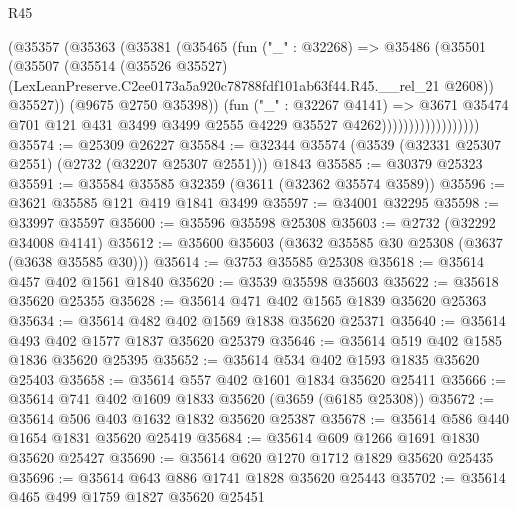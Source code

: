 \begin{lexlean}{R45}
\begin{coremodule}
                              (@35357
                                (@35363
                                  (@35381
                                    (@35465
                                      (fun ("_" : @32268) =>
                                      @35486
                                        (@35501
                                          (@35507
                                            (@35514
                                              (@35526 @35527)
                                              (LexLeanPreserve.C2ee0173a5a920c78788fdf101ab63f44.R45.__rel_21
                                                @2608))
                                            @35527))
                                        (@9675 @2750 @35398))
                                      (fun ("_" : @32267 @4141) =>
                                      @3671
                                        @35474
                                        @701
                                        @121
                                        @431
                                        @3499
                                        @3499
                                        @2555
                                        @4229
                                        @35527
                                        @4262))))))))))))))))))
@35574 := @25309 @26227
@35584 := @32344 @35574 (@3539 (@32331 @25307 @2551) (@2732 (@32207 @25307 @2551))) @1843
@35585 := @30379 @25323
@35591 := @35584 @35585 @32359 (@3611 (@32362 @35574 @3589))
@35596 := @3621 @35585 @121 @419 @1841 @3499
@35597 := @34001 @32295
@35598 := @33997 @35597
@35600 := @35596 @35598 @25308
@35603 := @2732 (@32292 @34008 @4141)
@35612 := @35600 @35603 (@3632 @35585 @30 @25308 (@3637 (@3638 @35585 @30)))
@35614 := @3753 @35585 @25308
@35618 := @35614 @457 @402 @1561 @1840
@35620 := @3539 @35598 @35603
@35622 := @35618 @35620 @25355
@35628 := @35614 @471 @402 @1565 @1839 @35620 @25363
@35634 := @35614 @482 @402 @1569 @1838 @35620 @25371
@35640 := @35614 @493 @402 @1577 @1837 @35620 @25379
@35646 := @35614 @519 @402 @1585 @1836 @35620 @25395
@35652 := @35614 @534 @402 @1593 @1835 @35620 @25403
@35658 := @35614 @557 @402 @1601 @1834 @35620 @25411
@35666 := @35614 @741 @402 @1609 @1833 @35620 (@3659 (@6185 @25308))
@35672 := @35614 @506 @403 @1632 @1832 @35620 @25387
@35678 := @35614 @586 @440 @1654 @1831 @35620 @25419
@35684 := @35614 @609 @1266 @1691 @1830 @35620 @25427
@35690 := @35614 @620 @1270 @1712 @1829 @35620 @25435
@35696 := @35614 @643 @886 @1741 @1828 @35620 @25443
@35702 := @35614 @465 @499 @1759 @1827 @35620 @25451

\end{coremodule}
\end{lexlean}
